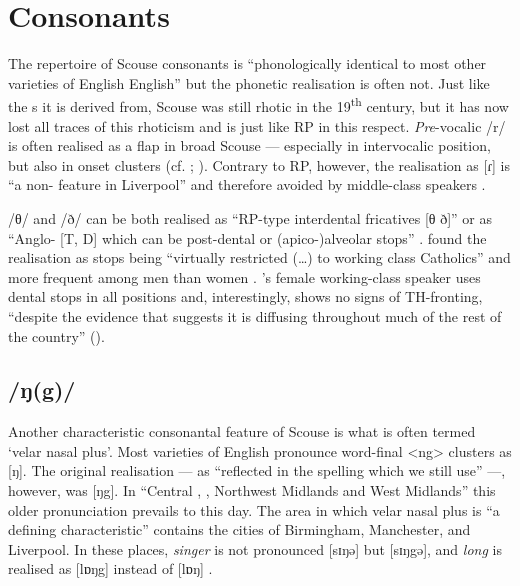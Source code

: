 	\section{Consonants}\label{sec.var.con}

The repertoire of Scouse consonants is ``phonologically identical to most other varieties of English English'' \citep[351]{watson2007} but the phonetic realisation is often not.
Just like the  s it is derived from, Scouse was still rhotic in the 19\textsuperscript{th} century, but it has now lost all traces of this rhoticism \citep[cf.][149]{knowles1997} and is just like RP in this respect.
\emph{Pre}-vocalic /r/ is often realised as a flap in broad Scouse --- especially in intervocalic position, but also in onset clusters (cf. \citealt[107 and 329--330]{knowles1973}; \citealt[352]{watson2007}).
Contrary to RP, however, the realisation as [ɾ] is ``a non- feature in Liverpool'' and therefore avoided by middle-class speakers \citep[329]{knowles1973}.

/θ/ and /ð/ can be both realised as ``RP-type interdental fricatives [θ ð]'' or as ``Anglo- [T, D] which can be post-dental or (apico-)alveolar stops'' \citep[323]{knowles1973}.
\citeauthor{knowles1973} found the realisation as stops being ``virtually restricted (\ldots) to working class Catholics'' and more frequent among men than women \citep[323--324]{knowles1973}.
\cite{watson2007}'s female working-class speaker uses dental stops in all positions and, interestingly, shows no signs of TH-fronting, ``despite the evidence that suggests it is diffusing throughout much of the rest of the country'' (\cite[cf.][352]{watson2007}).

		\subsection{/ŋ(g)/}\label{sec.var.con.ng}

Another characteristic consonantal feature of Scouse is what is often termed `velar nasal plus'.
Most varieties of English pronounce word-final <ng> clusters as [ŋ].
The original realisation --- as ``reflected in the spelling which we still use'' \citep[58]{trudgill1999} ---, however, was [ŋg]. In ``Central , , Northwest Midlands and West Midlands'' \citep[58]{trudgill1999} this older pronunciation prevails to this day. 
The area in which velar nasal plus is ``a defining characteristic'' \citep[58]{trudgill1999} contains the cities of Birmingham, Manchester, and Liverpool.
In these places, \emph{singer} is not pronounced [sɪŋə] but [sɪŋgə], and \emph{long} is realised as [lɒŋg] instead of [lɒŋ] \citep[cf.][58]{trudgill1999}.

